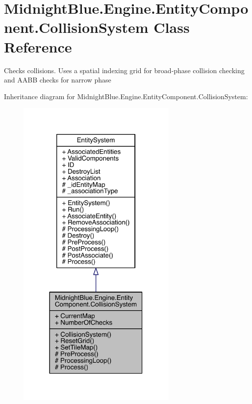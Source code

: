 \hypertarget{class_midnight_blue_1_1_engine_1_1_entity_component_1_1_collision_system}{}\section{Midnight\+Blue.\+Engine.\+Entity\+Component.\+Collision\+System Class Reference}
\label{class_midnight_blue_1_1_engine_1_1_entity_component_1_1_collision_system}


Checks collisions. Uses a spatial indexing grid for broad-\/phase collision checking and A\+A\+BB checks for narrow phase  




Inheritance diagram for Midnight\+Blue.\+Engine.\+Entity\+Component.\+Collision\+System\+:
\nopagebreak
\begin{figure}[H]
\begin{center}
\leavevmode
\includegraphics[width=222pt]{class_midnight_blue_1_1_engine_1_1_entity_component_1_1_collision_system__inherit__graph}
\end{center}
\end{figure}


